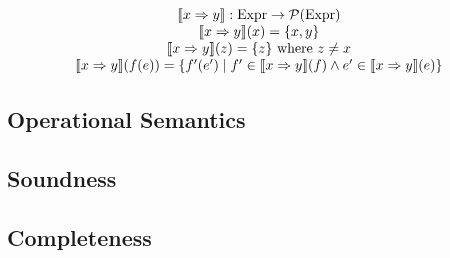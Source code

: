 \documentclass[runningheads]{llncs}
\begin{document}
\[
  \begin{array}{c}
    \llbracket x \Rightarrow y \rrbracket : \textnormal{Expr} \rightarrow \mathcal{P}(\textnormal{Expr})
    \\
    \llbracket x \Rightarrow y \rrbracket(x) = \{x, y\}
    \\
    \llbracket x \Rightarrow y \rrbracket(z) = \{z\}\textnormal{ where $z\neq x$}
    \\
    \llbracket x \Rightarrow y \rrbracket(f(e)) = \{ f'(e') \mid f' \in \llbracket x \Rightarrow y \rrbracket(f) \land e' \in \llbracket x \Rightarrow y \rrbracket(e) \}
  \end{array}
\]


\subsection{Operational Semantics}

\subsection{Soundness}

\subsection{Completeness}




\end{document}
